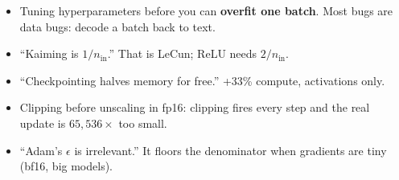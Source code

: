 \begin{trap}
\begin{itemize}
\item Tuning hyperparameters before you can \textbf{overfit one batch}. Most bugs are data bugs: decode a batch back to text.
\item ``Kaiming is $1/n_\text{in}$.'' That is LeCun; ReLU needs $2/n_\text{in}$.
\item ``Checkpointing halves memory for free.'' +33\% compute, activations only.
\item Clipping before unscaling in fp16: clipping fires every step and the real update is $65{,}536\times$ too small.
\item ``Adam's $\epsilon$ is irrelevant.'' It floors the denominator when gradients are tiny (bf16, big models).
\end{itemize}
\end{trap}
